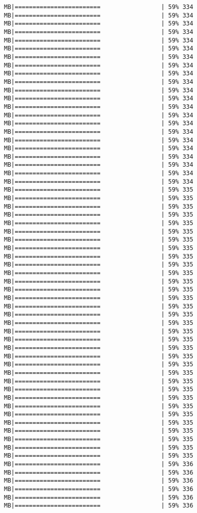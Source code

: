\documentclass[
]{article}
\begin{document}
\begin{verbatim}
MB|========================                 | 59% 334 MB|========================                 | 59% 334 MB|========================                 | 59% 334 MB|========================                 | 59% 334 MB|========================                 | 59% 334 MB|========================                 | 59% 334 MB|========================                 | 59% 334 MB|========================                 | 59% 334 MB|========================                 | 59% 334 MB|========================                 | 59% 334 MB|========================                 | 59% 334 MB|========================                 | 59% 334 MB|========================                 | 59% 334 MB|========================                 | 59% 334 MB|========================                 | 59% 334 MB|========================                 | 59% 334 MB|========================                 | 59% 334 MB|========================                 | 59% 334 MB|========================                 | 59% 334 MB|========================                 | 59% 334 MB|========================                 | 59% 334 MB|========================                 | 59% 334 MB|========================                 | 59% 335 MB|========================                 | 59% 335 MB|========================                 | 59% 335 MB|========================                 | 59% 335 MB|========================                 | 59% 335 MB|========================                 | 59% 335 MB|========================                 | 59% 335 MB|========================                 | 59% 335 MB|========================                 | 59% 335 MB|========================                 | 59% 335 MB|========================                 | 59% 335 MB|========================                 | 59% 335 MB|========================                 | 59% 335 MB|========================                 | 59% 335 MB|========================                 | 59% 335 MB|========================                 | 59% 335 MB|========================                 | 59% 335 MB|========================                 | 59% 335 MB|========================                 | 59% 335 MB|========================                 | 59% 335 MB|========================                 | 59% 335 MB|========================                 | 59% 335 MB|========================                 | 59% 335 MB|========================                 | 59% 335 MB|========================                 | 59% 335 MB|========================                 | 59% 335 MB|========================                 | 59% 335 MB|========================                 | 59% 335 MB|========================                 | 59% 335 MB|========================                 | 59% 335 MB|========================                 | 59% 335 MB|========================                 | 59% 335 MB|========================                 | 59% 335 MB|========================                 | 59% 336 MB|========================                 | 59% 336 MB|========================                 | 59% 336 MB|========================                 | 59% 336 MB|========================                 | 59% 336 MB|========================                 | 59% 336 
\end{verbatim}
\end{document}
